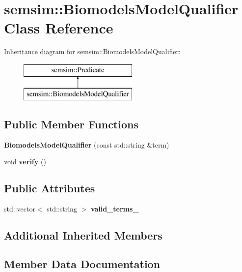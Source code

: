 \hypertarget{classsemsim_1_1BiomodelsModelQualifier}{}\section{semsim\+:\+:Biomodels\+Model\+Qualifier Class Reference}
\label{classsemsim_1_1BiomodelsModelQualifier}
Inheritance diagram for semsim\+:\+:Biomodels\+Model\+Qualifier\+:\begin{figure}[H]
\begin{center}
\leavevmode
\includegraphics[height=2.000000cm]{classsemsim_1_1BiomodelsModelQualifier}
\end{center}
\end{figure}
\subsection*{Public Member Functions}
\begin{DoxyCompactItemize}
\item 
\mbox{\label{classsemsim_1_1BiomodelsModelQualifier_a6a6020d5a6c3f863f9e6e0a0cae02174}} 
{\bfseries Biomodels\+Model\+Qualifier} (const std\+::string \&term)
\item 
\mbox{\label{classsemsim_1_1BiomodelsModelQualifier_a1db0d00db7d06e6cd858ac9e2e25cfe1}} 
void {\bfseries verify} ()
\end{DoxyCompactItemize}
\subsection*{Public Attributes}
\begin{DoxyCompactItemize}
\item 
std\+::vector$<$ std\+::string $>$ {\bfseries valid\+\_\+terms\+\_\+}
\end{DoxyCompactItemize}
\subsection*{Additional Inherited Members}


\subsection{Member Data Documentation}
\mbox{\label{classsemsim_1_1BiomodelsModelQualifier_a6c270c5a9d8592180253a0e3a1e4f9ae}} 
